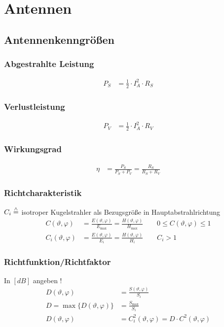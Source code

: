\section{Antennen}

\subsection{Antennenkenngrößen}



\subsubsection{Abgestrahlte Leistung}
\begin{align*}
    P_S & = \frac{1}{2}\cdot I_A^2 \cdot R_S
\end{align*}

\subsubsection{Verlustleistung}
\begin{align*}
    P_V & = \frac{1}{2}\cdot I_A^2\cdot R_V
\end{align*}

\subsubsection{Wirkungsgrad}
\begin{align*}
    \eta & = \frac{P_S}{P_S + P_V} = \frac{R_S}{R_S + R_V}
\end{align*}

\subsubsection{Richtcharakteristik}
$C_{i} \stackrel{\wedge}{=}$ isotroper Kugelstrahler als Bezugsgröße in Hauptabstrahlrichtung
\begin{align*}
    C(\vartheta, \varphi) &= \frac{E(\vartheta, \varphi)}{E_{\max }}=\frac{H(\vartheta, \varphi)}{H_{\max }} \qquad 0 \leq C(\vartheta, \varphi) \leq 1\\
    C_{i}(\vartheta, \varphi) &= \frac{E(\vartheta, \varphi)}{E_{i}}=\frac{H(\vartheta, \varphi)}{H_{i}}     \qquad C_{i}>1 
\end{align*}

\subsubsection{Richtfunktion/Richtfaktor}
In $[\si{dB}]$ angeben !
\begin{align*}
    D(\vartheta, \varphi) &= \frac{S(\vartheta, \varphi)}{S_{i}} \\
    D =\max \{D(\vartheta, \varphi)\} &= \frac{S_{\max}}{S_{i}} \\
    D(\vartheta, \varphi) &= C_{i}^{2}(\vartheta, \varphi) = D \cdot C^{2}(\vartheta, \varphi)
\end{align*}

